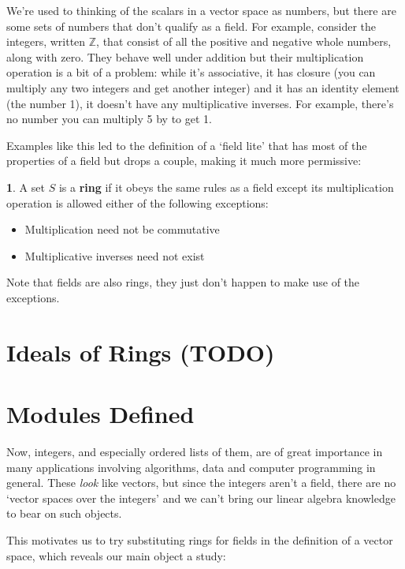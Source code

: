 \documentclass[oneside,english]{amsbook}
\numberwithin{section}{chapter}
\theoremstyle{plain}
\theoremstyle{definition}
\newtheorem{defn}[thm]{\protect\definitionname}
\providecommand{\definitionname}{Definition}
\begin{document}
			We're used to thinking of the scalars in a vector space as numbers, but there are some sets of numbers that don't qualify as a field. For example, consider the integers, written $\mathbb{Z}$, that consist of all the positive and negative whole numbers, along with zero. They behave well under addition but their multiplication operation is a bit of a problem: while it's associative, it has closure (you can multiply any two integers and get another integer) and it has an identity element (the number 1), it doesn't have any multiplicative inverses. For example, there's no number you can multiply 5 by to get 1.
			
			Examples like this led to the definition of a `field lite' that has most of the properties of a field but drops a couple, making it much more permissive:
		
			\begin{defn}
				A set $S$ is a \textbf{ring} if it obeys the same rules as a field except its multiplication operation is allowed either of the following exceptions:
				\begin{itemize}
					\item Multiplication need not be commutative
					\item Multiplicative inverses need not exist
					\end{itemize}
			\end{defn}
			
			Note that fields are also rings, they just don't happen to make use of the exceptions. 
		
		\section{Ideals of Rings (TODO)}
		\section{Modules Defined}
				
			Now, integers, and especially ordered lists of them, are of great importance in many applications involving algorithms, data and computer programming in general. These \emph{look} like vectors, but since the integers aren't a field, there are no `vector spaces over the integers' and we can't bring our linear algebra knowledge to bear on such objects. 
			
			This motivates us to try substituting rings for fields in the definition of a vector space, which reveals our main object a study:
			
\end{document}
